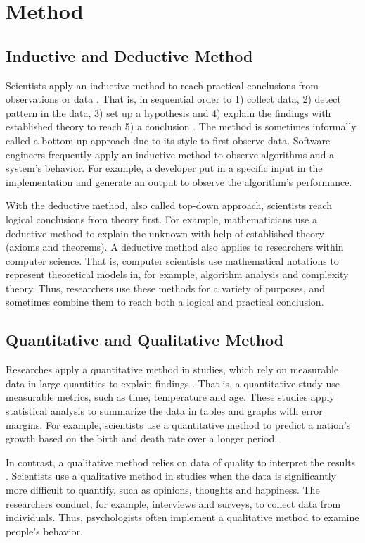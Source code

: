 \documentclass[a4paper,11pt]{kth-mag}
\newcommand*{\skippara}{\par\vspace{\baselineskip} \noindent}
\begin{document}
\chapter{Method}

\section{Inductive and Deductive Method}
Scientists apply an inductive method to reach practical conclusions from observations or data \cite{Omexperi69:online}.
That is, in sequential order to 1) collect data, 2) detect pattern in the data, 3) set up a hypothesis and 4) explain the findings with established theory to reach 5) a conclusion \cite{web:induction}.
The method is sometimes informally called a bottom-up approach due to its style to first observe data.
Software engineers frequently apply an inductive method to observe algorithms and a system's behavior.
For example, a developer put in a specific input in the implementation and generate an output to observe the algorithm's performance.

\skippara With the deductive method, also called top-down approach, scientists reach logical conclusions from theory first.
For example, mathematicians use a deductive method to explain the unknown with help of established theory (axioms and theorems).
A deductive method also applies to researchers within computer science.
That is, computer scientists use mathematical notations to represent theoretical models in, for example, algorithm analysis and complexity theory.
Thus, researchers use these methods for a variety of purposes, and sometimes combine them to reach both a logical and practical conclusion.

\section{Quantitative and Qualitative Method}

Researches apply a quantitative method in studies, which rely on measurable data in large quantities to explain findings \cite{haakansson2013portal}.
That is, a quantitative study use measurable metrics, such as time, temperature and age.
These studies apply statistical analysis to summarize the data in tables and graphs with error margins.
For example, scientists use a quantitative method to predict a nation's growth based on the birth and death rate over a longer period.

\skippara In contrast, a qualitative method relies on data of quality to interpret the results \cite{merriam2009qualitative}.
Scientists use a qualitative method in studies when the data is significantly more difficult to quantify, such as opinions, thoughts and happiness.
The researchers conduct, for example, interviews and surveys, to collect data from individuals.
Thus, psychologists often implement a qualitative method to examine people's behavior.
\end{document}

